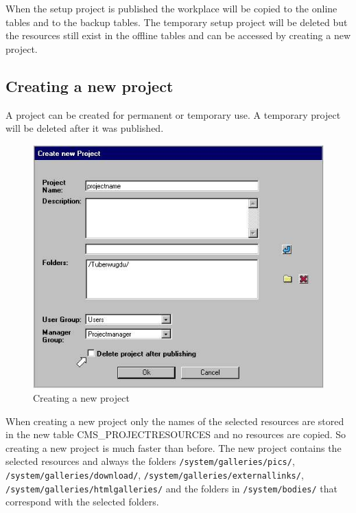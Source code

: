 When the setup project is published the workplace will be copied
to the online tables and to the backup tables. The temporary setup
project will be deleted but the resources still exist in the
offline tables and can be accessed by creating a new project.

\subsection{Creating a new project}

A project can be created for permanent or temporary use. A
temporary project will be deleted after it was published.

\begin{figure}[hbt]
\begin{center}
\includegraphics[width=\sgw]
                   {pics/newProject/newPro01}
\caption[Creating a new project]
           {Creating a new project}
\label{newproject}
\end{center}
\end{figure}

When creating a new project only the names of the selected
resources are stored in the new table CMS\_PROJECTRESOURCES and no
resources are copied. So creating a new project is much faster
than before. The new project contains the selected resources and
always the folders \texttt{/system/galleries/pics/}, \texttt{/system/galleries/download/}, \texttt{/system/galleries/externallinks/}, 
\texttt{/system/galleries/htmlgalleries/} and  the folders
in \texttt{/system/bodies/} that correspond with the selected folders.


